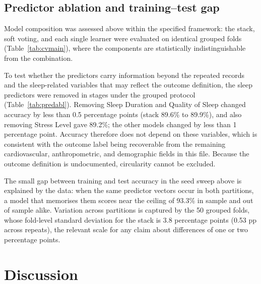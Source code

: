 \documentclass[a4paper,fleqn]{cas-dc}
\begin{document}
\subsection{Predictor ablation and training--test gap}
\label{sec:ablation2}
Model composition was assessed above within the specified framework: the stack, soft voting, and each single learner were evaluated on identical grouped folds (Table~\ref{tab:cvmain}), where the components are statistically indistinguishable from the combination.

To test whether the predictors carry information beyond the repeated records and the sleep-related variables that may reflect the outcome definition, the sleep predictors were removed in stages under the grouped protocol (Table~\ref{tab:predabl}). Removing Sleep Duration and Quality of Sleep changed accuracy by less than 0.5 percentage points (stack 89.6\% to 89.9\%), and also removing Stress Level gave 89.2\%; the other models changed by less than 1 percentage point. Accuracy therefore does not depend on these variables, which is consistent with the outcome label being recoverable from the remaining cardiovascular, anthropometric, and demographic fields in this file. Because the outcome definition is undocumented, circularity cannot be excluded.

\begin{table}[width=\columnwidth,pos=!tbp]
\centering
\caption{Accuracy (\%) under grouped CV after removing sleep-related predictors.}
\label{tab:predabl}
\small

\end{table}

The small gap between training and test accuracy in the seed sweep above is explained by the data: when the same predictor vectors occur in both partitions, a model that memorises them scores near the ceiling of 93.3\% in sample and out of sample alike. Variation across partitions is captured by the 50 grouped folds, whose fold-level standard deviation for the stack is 3.8 percentage points (0.53 pp across repeats), the relevant scale for any claim about differences of one or two percentage points.



\FloatBarrier
\section{Discussion}
\label{sec:discussion}
\end{document}
